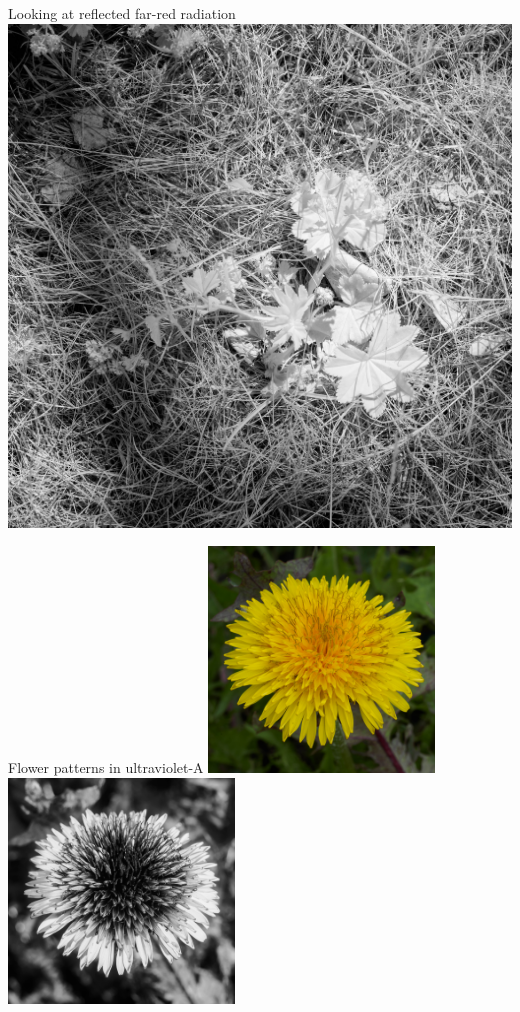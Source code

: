 \documentclass[10pt]{beamer}\usepackage[]{graphicx}\usepackage[]{color}
\begin{document}
\begin{frame}{Looking at reflected far-red radiation}
    \includegraphics[height=0.45\textheight]{photos/far-red-3}

\end{frame}

\begin{frame}{Flower patterns in ultraviolet-A}
    \centering
    \includegraphics[width=0.45\textwidth]{photos/taraxacum-vis}\ %
    \includegraphics[width=0.45\textwidth]{photos/taraxacum-uva}\\

\end{frame}
\end{document}
